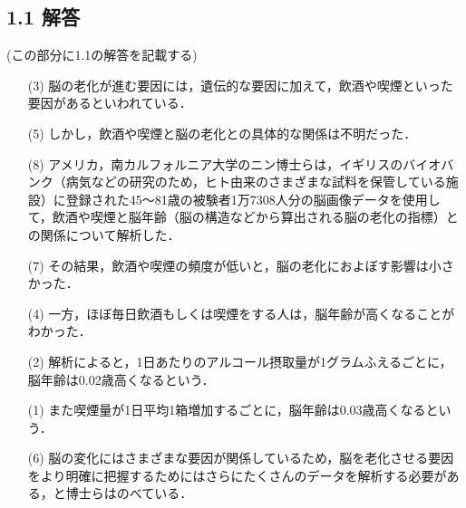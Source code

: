 \documentclass[11pt, a4paper]{jsarticle}
\begin{document}
\subsection*{1.1 解答}
(この部分に1.1の解答を記載する)
\begin{itemize}
    \item[(3)]脳の老化が進む要因には，遺伝的な要因に加えて，飲酒や喫煙といった要因があるといわれている．
    \item[(5)]しかし，飲酒や喫煙と脳の老化との具体的な関係は不明だった．\\

    \item[(8)]アメリカ，南カルフォルニア大学のニン博士らは，イギリスのバイオバンク（病気などの研究のため，ヒト由来のさまざまな試料を保管している施設）に登録された45～81歳の被験者1万7308人分の脳画像データを使用して，飲酒や喫煙と脳年齢（脳の構造などから算出される脳の老化の指標）との関係について解析した．
    \item[(7)]その結果，飲酒や喫煙の頻度が低いと，脳の老化におよぼす影響は小さかった．
    \item[(4)]一方，ほぼ毎日飲酒もしくは喫煙をする人は，脳年齢が高くなることがわかった．\\

    \item[(2)]解析によると，1日あたりのアルコール摂取量が1グラムふえるごとに，脳年齢は0.02歳高くなるという．
    \item[(1)]また喫煙量が1日平均1箱増加するごとに，脳年齢は0.03歳高くなるという．
    \item[(6)]脳の変化にはさまざまな要因が関係しているため，脳を老化させる要因をより明確に把握するためにはさらにたくさんのデータを解析する必要がある，と博士らはのべている．
\end{itemize}

\end{document}
